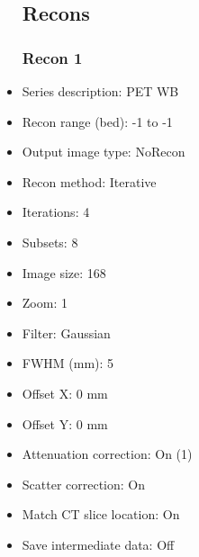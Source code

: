 \documentclass[12pt]{article}
\begin{document}
\begin{itemize}[noitemsep]
\subsection{Recons}
\subsubsection{Recon 1}
\item Series description: PET WB 
\item Recon range (bed): -1 to -1
\item Output image type: NoRecon
\item Recon method: Iterative
\item Iterations: 4
\item Subsets: 8
\item Image size: 168
\item Zoom: 1
\item Filter: Gaussian
\item FWHM (mm): 5
\item Offset X: 0 mm
\item Offset Y: 0 mm
\item Attenuation correction: On (1)
\item Scatter correction: On
\item Match CT slice location: On
\item Save intermediate data: Off
\end{itemize}
\end{document}
